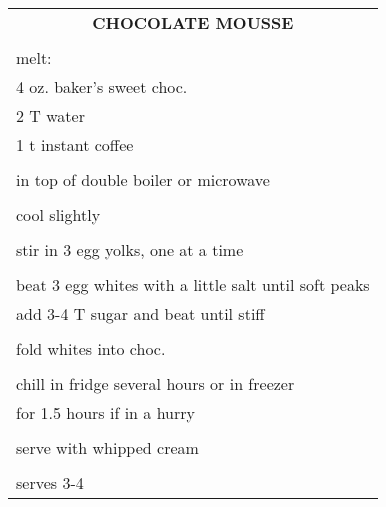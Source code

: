 \documentclass[8pt]{report}
\begin{document}
\newpage

\centering

\begin{tabular}{|l|} \hline	%
 
\multicolumn{1}{|c|}{\textbf{CHOCOLATE MOUSSE}}
\\
\\

\index{desserts!chocolate mousse} \index{chocolate mousse}

melt: \\
\hspace{0.5 in}	4 oz. baker's sweet choc.\\
\hspace{0.5 in}	2 T water\\
\hspace{0.5 in}	1 t instant coffee\\
\\
in top of double boiler or microwave\\
\\
cool slightly\\
\\
stir in 3 egg yolks, one at a time\\
\\
beat 3 egg whites with a little salt until soft peaks\\
add 3-4 T sugar and beat until stiff\\
\\
fold whites into choc.\\
\\
chill in fridge several hours or in freezer\\
for 1.5 hours if in a hurry\\
\\
serve with whipped cream\\
\\
serves 3-4\\

\hline

\end{tabular}

\newpage

\centering
\end{document}
